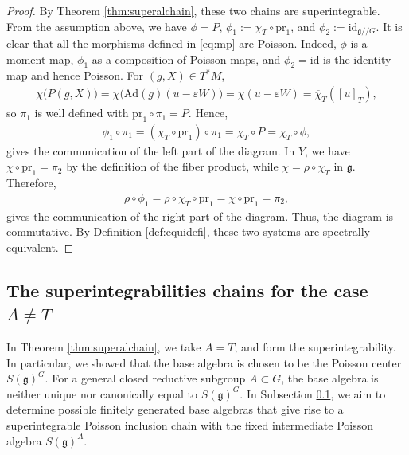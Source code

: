 \documentclass[11pt,reqno]{amsart}
\newtheorem*{theorem A}{Main Theorem A}
\newtheorem*{theorem B}{Main Theorem B}
\newtheorem*{theorem C}{Main Theorem C}
\newtheorem*{theorem D}{Main Theorem D}
\theoremstyle{definition}
\theoremstyle{plain}
\newtheorem{remark}[theorem]{Remark}
\theoremstyle{conclusion}
\begin{document}
\begin{proof}
By Theorem \ref{thm:superalchain}, these two chains are superintegrable.   From the assumption above, we have
$\phi =P$, $\phi_1:=\chi_T\circ \mathrm{pr}_1$, and $\phi_2:=\mathrm{id}_{\mathfrak{g}//G}$. It is clear that all the morphisms defined in \eqref{eq:mp} are Poisson. Indeed, $\phi$ is a moment map, $\phi_1$ as a composition of Poisson maps, and $\phi_2 =\mathrm{id}$ is the identity map and hence Poisson. For $(g,X)\in T^* M$, \begin{align*}
\chi\bigl(P(g,X)\bigr) =\chi\bigl(\mathrm{Ad}(g)(u-\varepsilon W)\bigr) =\chi(u-\varepsilon W) = \overline\chi_T([u]_T),
\end{align*} so $\pi_1$ is well defined with $\mathrm{pr}_1\circ\pi_1=P$.  Hence, \begin{align*}
\phi_1\circ \pi_1 =(\chi_T\circ \mathrm{pr}_1)\circ \pi_1 = \chi_T\circ P =\chi_T\circ \phi,
\end{align*} gives the communication of the left part of the diagram. In $Y$, we have $\chi\circ \mathrm{pr}_1=\pi_2$ by the definition of the fiber product, while $\chi=\rho\circ \chi_T$ in $\mathfrak{g}$. Therefore, \begin{align*}
\rho\circ \phi_1 =\rho\circ \chi_T\circ \mathrm{pr}_1 = \chi\circ \mathrm{pr}_1 =\pi_2,
\end{align*} gives the communication of the right part of the diagram. Thus, the diagram is commutative. By Definition \ref{def:equidefi}, these two systems are spectrally equivalent.
\end{proof}




\subsection{The superintegrabilities chains for the case \texorpdfstring{$A\neq T$}{A≠T} }
\label{subsec:AnotequalT}
In Theorem \ref{thm:superalchain},  we take $A = T$, and form the superintegrability. In particular, we showed that the base algebra is chosen to be the Poisson center $S(\mathfrak{g})^G$. For a general closed reductive subgroup $A \subset G$, the base algebra is neither unique nor canonically equal to $S(\mathfrak{g})^G$. In Subsection \ref{subsec:AnotequalT}, we aim to determine possible finitely generated base algebras that give rise to a superintegrable Poisson inclusion chain with the fixed intermediate Poisson algebra $S(\mathfrak{g})^A$.
\end{document}

